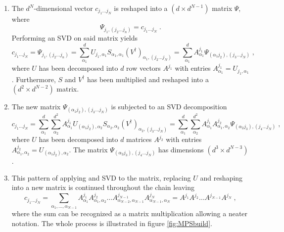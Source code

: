 \begin{enumerate}
\item
The $d^N$-dimensional vector $c_{j_1 \ldots j_N}$ is reshaped into a $(d \times d^{N-1})$ matrix $\Psi$, where
\begin{equation}
	\Psi_{j_1 , (j_2 \ldots j_n)} = c_{j_1 \ldots j_N} \; .
\end{equation}
Performing an SVD on said matrix yields
\begin{equation}
	c_{j_1 \ldots j_N} = \Psi_{j_1 , (j_2 \ldots j_n)} = \sum_{\alpha_1}^{d} U_{j_1 , \alpha_1} S_{\alpha_1 , \alpha_1} (V^{\dag})_{\alpha_1 , (j_2 \ldots j_N)} = \sum_{\alpha_1}^{d} A_{\alpha_1}^{j_1} \Psi_{(\alpha_1 j_2),(j_3 \ldots j_N)} \; ,
\end{equation}
where $U$ has been decomposed into $d$ row vectors $A^{j_1}$ with entries $A_{\alpha_1}^{j_1} = U_{j_1 , \alpha_1}$. Furthermore, $S$ and $V^{\dag}$ has been multiplied and reshaped into a $(d^2 \times d^{N-2})$ matrix.

\item
The new matrix $\Psi_{(\alpha_1 j_2),(j_3 \ldots j_N)}$ is subjected to an SVD decomposition
\begin{equation}
	c_{j_1 \ldots j_N} = \sum_{\alpha_1}^{d} \sum_{\alpha_2}^{d^2} A_{\alpha_1}^{j_1} U_{(\alpha_1 j_2) , \alpha_2} S_{\alpha_2 , \alpha_2} (V^{\dag})_{\alpha_2 , (j_3 \ldots j_N)} = \sum_{\alpha_1}^{d} \sum_{\alpha_2}^{d^2} A_{\alpha_1}^{j_1} A_{\alpha_1 , \alpha_2}^{j_2} \Psi_{(\alpha_2 j_3),(j_4 \ldots j_N)} \; ,
\end{equation}
where $U$ has been decomposed into $d$ matrices $A^{j_2}$ with entries $A_{\alpha_1 , \alpha_2}^{j_2} = U_{(\alpha_1 j_2) , \alpha_2}$. The matrix $\Psi_{(\alpha_2 j_3),(j_4 \ldots j_N)}$ has dimensions $(d^3 \times d^{N-3})$.

\item
This pattern of applying and SVD to the matrix, replacing $U$ and reshaping into a new matrix is continued throughout the chain leaving 
\begin{equation}
	c_{j_1 \ldots j_N} = \sum_{\alpha_1 , \ldots , \alpha_{N-1}} A_{\alpha_1}^{j_1} A_{\alpha_1 , \alpha_2}^{j_2} \ldots A_{\alpha_{N-2} ,\alpha_{N-1}}^{j_{N-1}} A_{\alpha_{N-1} ,\alpha_{N}}^{j_{N}} = A^{j_1} A^{j_2} \ldots A^{j_{N-1}} A^{j_{N}} \; ,
\end{equation}
where the sum can be recognized as a matrix multiplication allowing a neater notation. The whole process is illustrated in figure \ref{fig:MPSbuild}.

\end{enumerate}

